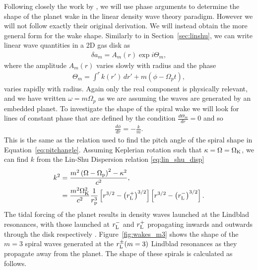 Following closely the work by \citet{ogilvie2002}, we will use phase arguments to determine the shape of the planet wake in the linear density wave theory paradigm.
However we will not follow exactly their original derivation.
We will instead obtain the more general form for the wake shape.
Similarly to in Section~\ref{sec:linshu}, we can write linear wave quantities in a 2D gas disk as 
\begin{align}
    \delta a_m = A_m(r) \exp{i \Theta_m},
\end{align}
where the amplitude $A_m(r)$ varies slowly with radius and the phase
\begin{align}
    \Theta_m = \int^r k(r') \, dr' + m (\phi - \Omega_p t),
\end{align}
varies rapidly with radius. 
Again only the real component is physically relevant, and we have written $\omega = m \Omega_p$ as we are assuming the waves are generated by an embedded planet.
To investigate the shape of the spiral wake we will look for lines of constant phase that are defined by the condition $\frac{d\Theta_m}{dr} = 0$ and so 
\begin{align}
    \frac{d\phi}{dr} = - \frac{k}{m}. \label{eq:spiral_km}
\end{align}
This is the same as the relation used to find the pitch angle of the spiral shape in Equation~\eqref{eq:pitchangle}.
Assuming Keplerian rotation such that $\kappa=\Omega=\Omega_{\rm K}$, we can find $k$ from the Lin-Shu Dispersion relation \eqref{eq:lin_shu_disp}
\begin{align}
    k^2 &= \frac{m^2 \left( \Omega - \Omega_{\rm p} \right)^2 - \kappa^2}{c^2}, \\
    &= \frac{m^2 \Omega_{\rm K}^2}{c^2} \frac{1}{r_{\rm p}^3} \left[ r^{3/2} - \left( r_{\rm L}^+ \right)^{3/2} \right] \left[ r^{3/2} - \left( r_{\rm L}^- \right)^{3/2} \right].
\end{align}
The tidal forcing of the planet results in density waves launched at the Lindblad resonances, with those launched at $r_{\rm L}^-$ and $r_{\rm L}^+$ propagating inwards and outwards through the disk respectively \citep{goldreich1978,goldreich1979}.
Figure~\ref{fig:wakes_m3} shows the shape of the $m=3$ spiral waves generated at the $r_{\rm L}^\pm (m=3)$ Lindblad resonances as they propagate away from the planet.
The shape of these spirals is calculated as follows.
